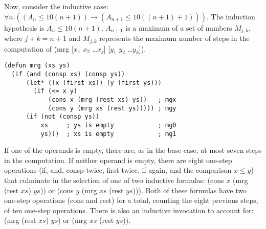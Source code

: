 Now, consider the inductive case:
$\forall n.((A_n \leq 10(n+1)) \rightarrow (A_{n+1} \leq 10((n+1) + 1)))$.
The induction hypothesis is $A_n \leq 10(n + 1)$.
$A_{n+1}$ is a maximum of a set of numbers $M_{j,k}$, where $j + k = n+1$
and $M_{j,k}$ represents the maximum number of steps in the computation of
\textsf{(mrg [$x_1$ $x_2$ \dots $x_j$] [$y_1$ $y_2$ \dots $y_k$])}.

\label{defun:mrg-copy}
\begin{code}
\begin{verbatim}
(defun mrg (xs ys)
  (if (and (consp xs) (consp ys))
      (let* ((x (first xs)) (y (first ys)))
        (if (<= x y)
            (cons x (mrg (rest xs) ys))   ; mgx
            (cons y (mrg xs (rest ys))))) ; mgy
      (if (not (consp ys))
          xs     ; ys is empty            ; mg0
          ys)))  ; xs is empty            ; mg1
\end{verbatim}
\end{code}

If one of the operands is empty, there are, as in the base case,
at most seven steps in the computation.
If neither operand is empty, there are eight one-step operations
(\textsf{if}, \textsf{and}, \textsf{consp} twice,
\textsf{first} twice, \textsf{if} again, and the comparison $x \leq y$)
that culminate in the selection of
one of two inductive formulas: \textsf{(cons $x$ (mrg (rest $xs$) $ys$))}
or \textsf{(cons $y$ (mrg $xs$ (rest $ys$)))}.
Both of these formulas have two one-step operations (\textsf{cons} and \textsf{rest})
for a total, counting the eight previous steps, of ten one-step operations.
There is also an inductive invocation to account for:
\textsf{(mrg (rest $xs$) $ys$) or (mrg $xs$ (rest $ys$))}.

